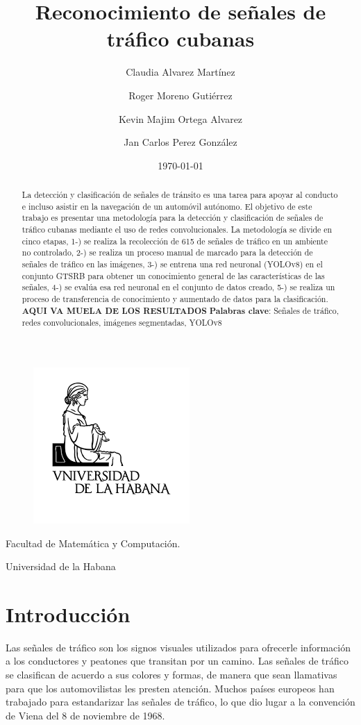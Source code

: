 \documentclass{article}
\title{Reconocimiento de señales de tráfico cubanas}
\author {
Claudia Alvarez Martínez \and
Roger Moreno Gutiérrez \and
Kevin Majim Ortega Alvarez \and
Jan Carlos Perez González
}
\date {\today}
\begin{document}
\begin{figure}[t]
    \centering
    \includegraphics{resources/Universidad de la habana logo.png}
\end{figure}
\maketitle
\begin{center}
Facultad de Matemática y Computación.

 Universidad de la Habana
\end{center}
\newpage
\begin{abstract}
La detección y clasificación de señales de tránsito es una tarea para apoyar al conducto e incluso asistir en la navegación de un automóvil autónomo. El objetivo de este trabajo es presentar una metodología para la detección y clasificación de señales de tráfico cubanas mediante el uso de redes convolucionales. La metodología se divide en cinco etapas, 1-) se realiza la recolección de 615 de señales de tráfico en un ambiente no controlado, 2-) se realiza un proceso manual de marcado para la detección de señales de tráfico en las imágenes, 3-) se entrena una red neuronal (YOLOv8) en el conjunto GTSRB para obtener un conocimiento general de las características de las señales, 4-) se evalúa esa red neuronal en el conjunto de datos creado, 5-) se realiza un proceso de transferencia de conocimiento y aumentado de datos para la clasificación. \textbf{AQUI VA MUELA DE LOS RESULTADOS}
\vfill
\textbf{Palabras clave}: Señales de tráfico, redes convolucionales, imágenes segmentadas, YOLOv8
\end{abstract}
\newpage
\section{Introducción}
Las señales de tráfico son los signos visuales utilizados para ofrecerle información a los conductores y peatones que transitan por un camino. Las señales de tráfico se clasifican de acuerdo a sus colores y formas, de manera que sean llamativas para que los automovilistas les presten atención. Muchos países europeos han trabajado para estandarizar las señales de tráfico, lo que dio lugar a la convención de Viena del 8 de noviembre de 1968. 
\end{document}
